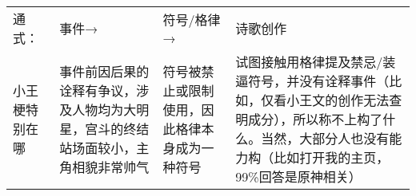 \begin{zhihuanswer}
\begin{longtable}[]{@{}llll@{}}
\toprule\noalign{}
\endhead
\bottomrule\noalign{}
\endlastfoot
通式： & 事件→ & 符号/格律→ & 诗歌创作 \\
小王梗特别在哪 &
事件前因后果的诠释有争议，涉及人物均为大明星，宫斗的终结站场面较小，主角相貌非常帅气
& 符号被禁止或限制使用，因此格律本身成为一种符号 &
试图接触用格律提及禁忌/装逼符号，并没有诠释事件（比如，仅看小王文的创作无法查明成分），所以称不上构了什么。当然，大部分人也没有能力构（比如打开我的主页，99\%回答是原神相关） \\
\end{longtable}
\end{zhihuanswer}
